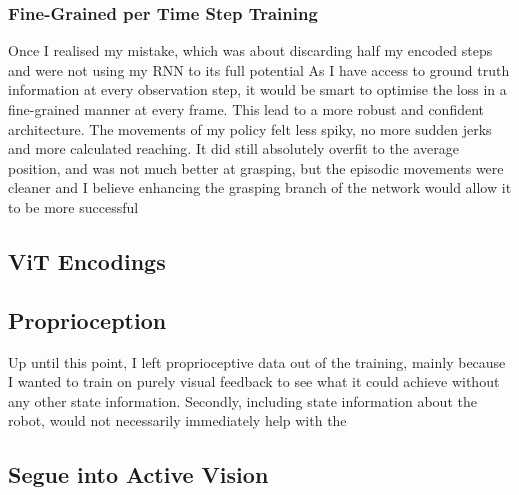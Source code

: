 

\subsubsection{Fine-Grained per Time Step Training}
Once I realised my mistake, which was about discarding half my encoded steps and were not using my RNN to its full potential  As I have access to ground truth information at every observation step, it would be smart to optimise the loss in a fine-grained manner at every frame.
This lead to a more robust and confident architecture. The movements of my policy felt less spiky, no more sudden jerks and more calculated reaching. It did still absolutely overfit to the average position, and was not much better at grasping, but the episodic movements were cleaner and I believe enhancing the grasping branch of the network would allow it to be more successful 


\subsection{ViT Encodings}

\subsection{Proprioception}
Up until this point, I left proprioceptive data out of the training, mainly because I wanted to train on purely visual feedback to see what it could achieve without any other state information. Secondly, including state information about the robot, would not necessarily immediately help with the 

\subsection{Segue into Active Vision}




